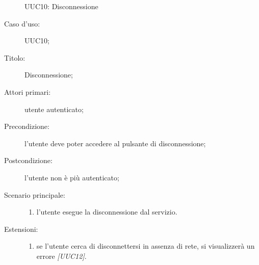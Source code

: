 \documentclass[../../../analisi-dei-requisiti.tex]{subfiles}
\begin{document}
\begin{figure}[H]
  \centering
  \caption{UUC10: Disconnessione}%
  \label{fig:UUC10}
\end{figure}

  \begin{description}
  \item[Caso d’uso:] UUC10;
  \item[Titolo:] Disconnessione;
  \item[Attori primari:] utente autenticato;
  \item[Precondizione:] l'utente deve poter accedere al pulsante di disconnessione;
  \item[Postcondizione:] l'utente non è più autenticato;
  \item[Scenario principale:]
        \begin{enumerate}
          \item l'utente esegue la disconnessione dal servizio.
        \end{enumerate}
  \item[Estensioni:]
        \begin{enumerate}
          \item se l'utente cerca di disconnettersi in assenza di rete, si visualizzerà un errore \emph{[UUC12]}.
        \end{enumerate}
\end{description}
\end{document}
